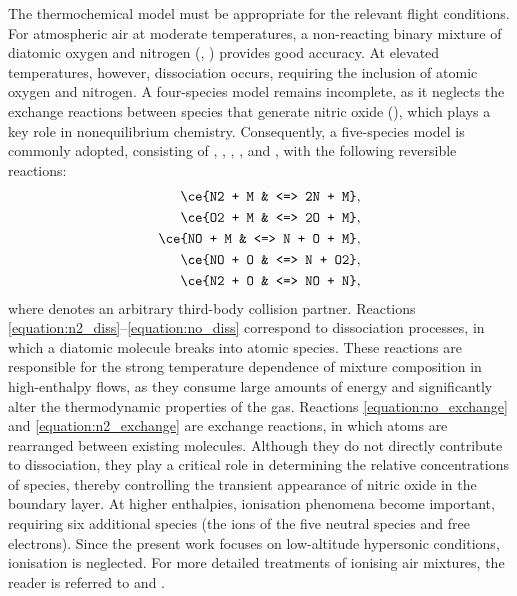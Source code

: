 The thermochemical model must be appropriate for the relevant flight conditions. For atmospheric air at moderate temperatures, a non-reacting binary mixture of diatomic oxygen and nitrogen (, ) provides good accuracy. At elevated temperatures, however, dissociation occurs, requiring the inclusion of atomic oxygen and nitrogen. A four-species model remains incomplete, as it neglects the exchange reactions between species that generate nitric oxide (), which plays a key role in nonequilibrium chemistry. Consequently, a five-species model is commonly adopted, consisting of , , , , and , with the following reversible reactions:
\begin{align}
    \ce{N2 + M & <=> 2N + M}, \label{equation:n2_diss} \\ 
    \ce{O2 + M & <=> 2O + M}, \label{equation:o2_diss} \\
    \ce{NO + M & <=> N + O + M}, \label{equation:no_diss} \\
    \ce{NO + O & <=> N + O2}, \label{equation:no_exchange} \\
    \ce{N2 + O & <=> NO + N}, \label{equation:n2_exchange}
\end{align}
where  denotes an arbitrary third-body collision partner. Reactions \eqref{equation:n2_diss}--\eqref{equation:no_diss} correspond to dissociation processes, in which a diatomic molecule breaks into atomic species. These reactions are responsible for the strong temperature dependence of mixture composition in high-enthalpy flows, as they consume large amounts of energy and significantly alter the thermodynamic properties of the gas. Reactions \eqref{equation:no_exchange} and \eqref{equation:n2_exchange} are exchange reactions, in which atoms are rearranged between existing molecules. Although they do not directly contribute to dissociation, they play a critical role in determining the relative concentrations of species, thereby controlling the transient appearance of nitric oxide in the boundary layer. At higher enthalpies, ionisation phenomena become important, requiring six additional species (the ions of the five neutral species and free electrons). Since the present work focuses on low-altitude hypersonic conditions, ionisation is neglected. For more detailed treatments of ionising air mixtures, the reader is referred to \citet{BoseCandler1998} and \citet{ChaudhryEtAl2018}.

